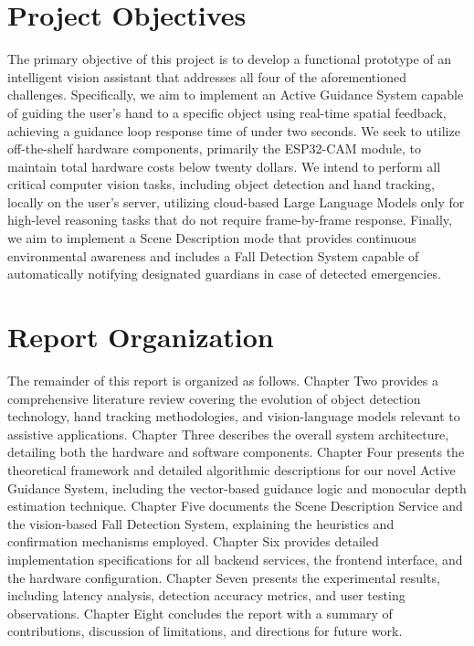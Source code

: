 \documentclass[12pt,a4paper]{report}
\begin{document}
\section{Project Objectives}

The primary objective of this project is to develop a functional prototype of an intelligent vision assistant that addresses all four of the aforementioned challenges. Specifically, we aim to implement an Active Guidance System capable of guiding the user's hand to a specific object using real-time spatial feedback, achieving a guidance loop response time of under two seconds. We seek to utilize off-the-shelf hardware components, primarily the ESP32-CAM module, to maintain total hardware costs below twenty dollars. We intend to perform all critical computer vision tasks, including object detection and hand tracking, locally on the user's server, utilizing cloud-based Large Language Models only for high-level reasoning tasks that do not require frame-by-frame response. Finally, we aim to implement a Scene Description mode that provides continuous environmental awareness and includes a Fall Detection System capable of automatically notifying designated guardians in case of detected emergencies.

\section{Report Organization}

The remainder of this report is organized as follows. Chapter Two provides a comprehensive literature review covering the evolution of object detection technology, hand tracking methodologies, and vision-language models relevant to assistive applications. Chapter Three describes the overall system architecture, detailing both the hardware and software components. Chapter Four presents the theoretical framework and detailed algorithmic descriptions for our novel Active Guidance System, including the vector-based guidance logic and monocular depth estimation technique. Chapter Five documents the Scene Description Service and the vision-based Fall Detection System, explaining the heuristics and confirmation mechanisms employed. Chapter Six provides detailed implementation specifications for all backend services, the frontend interface, and the hardware configuration. Chapter Seven presents the experimental results, including latency analysis, detection accuracy metrics, and user testing observations. Chapter Eight concludes the report with a summary of contributions, discussion of limitations, and directions for future work.
\end{document}
